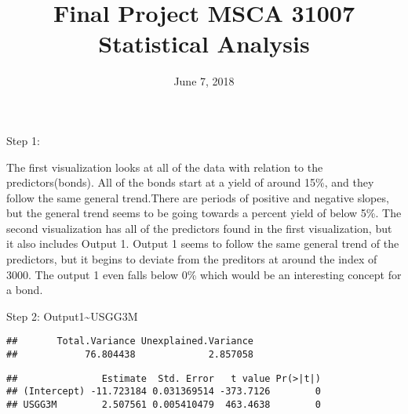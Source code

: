 \documentclass[]{article}
\title{Final Project MSCA 31007 Statistical Analysis}
\author{}
\date{June 7, 2018}
\newenvironment{Shaded}{\begin{snugshade}}{\end{snugshade}}
\newcommand{\KeywordTok}[1]{\textcolor[rgb]{0.13,0.29,0.53}{\textbf{#1}}}
\newcommand{\DataTypeTok}[1]{\textcolor[rgb]{0.13,0.29,0.53}{#1}}
\newcommand{\DecValTok}[1]{\textcolor[rgb]{0.00,0.00,0.81}{#1}}
\newcommand{\OperatorTok}[1]{\textcolor[rgb]{0.81,0.36,0.00}{\textbf{#1}}}
\newcommand{\NormalTok}[1]{#1}
\begin{document}
\maketitle

{
\setcounter{tocdepth}{3}
\tableofcontents
}
Step 1:

The first visualization looks at all of the data with relation to the
predictors(bonds). All of the bonds start at a yield of around 15\%, and
they follow the same general trend.There are periods of positive and
negative slopes, but the general trend seems to be going towards a
percent yield of below 5\%. The second visualization has all of the
predictors found in the first visualization, but it also includes Output
1. Output 1 seems to follow the same general trend of the predictors,
but it begins to deviate from the preditors at around the index of 3000.
The output 1 even falls below 0\% which would be an interesting concept
for a bond.

Step 2: Output1\textasciitilde{}USGG3M

\begin{Shaded}
\end{Shaded}

\begin{verbatim}
##       Total.Variance Unexplained.Variance 
##            76.804438             2.857058
\end{verbatim}

\begin{Shaded}
\end{Shaded}

\begin{verbatim}
##               Estimate  Std. Error   t value Pr(>|t|)
## (Intercept) -11.723184 0.031369514 -373.7126        0
## USGG3M        2.507561 0.005410479  463.4638        0
\end{verbatim}
\end{document}
